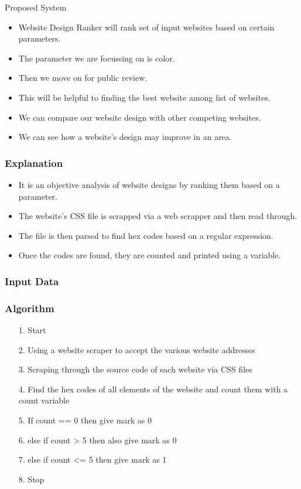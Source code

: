 \documentclass[11pt]{beamer}
\begin{document}
	\begin{frame}{Proposed System}
\begin{itemize}
	\item Website Design Ranker will rank set of input websites based on certain parameters.
	\item The parameter we are focussing on is color.
	\item Then we move on for public review.
	\item This will be helpful to finding the best website among list of websites.
	\item We can compare our website design with other competing websites.
	\item We can see how a website's design may improve in an area.
	
\end{itemize}
\end{frame}
\begin{frame}
\frametitle{Explanation}
\begin{itemize}
	\item It is an objective analysis of website designs by ranking them based on a parameter.
	\item The website's CSS file is scrapped via a web scrapper and then read through.
	\item The file is then parsed to find hex codes based on a regular expression.
	\item Once the codes are found, they are counted and printed using a variable.
\end{itemize}
\end{frame}
\begin{frame}
\frametitle{Input Data}
\end{frame}
	\begin{frame}
	\frametitle{{Algorithm}}
	\begin{enumerate}
		\item[1.] Start
		\item[2.] Using a website scraper to accept the various website addresses
		\item[3.] Scraping through the source code of each website via CSS files
		\item[4.] Find the hex codes of all elements of the website and count them with a count variable
		\item[5.] If count == 0 then give mark as 0
		\item[6.] else if count > 5 then also give mark as 0
		\item[7.] else if count <= 5 then give mark as 1
		\item[8.] Stop
	\end{enumerate}
	
	\end{frame}
\end{document}

